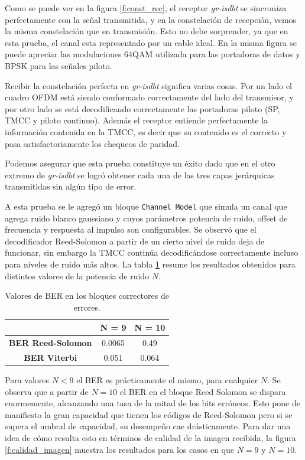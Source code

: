 Como se puede ver en la figura \ref{f:const_rec}, el receptor \textit{gr-isdbt} se sincroniza perfectamente con la señal transmitida, y en la constelación de recepción, vemos la misma constelación que en transmisión. Esto no debe sorprender, ya que en esta prueba, el canal esta representado por un cable ideal. En la misma figura se puede apreciar las modulaciones 64QAM utilizada para las portadoras de datos y BPSK para las señales piloto. 

Recibir la constelación perfecta en \textit{gr-isdbt} significa varias cosas. Por un lado el cuadro OFDM está siendo conformado correctamente del lado del transmisor, y por otro lado se está decodificando correctamente las portadoras piloto (SP, TMCC y piloto continuo). Además el receptor entiende perfectamente la información contenida en la TMCC, es decir que su contenido es el correcto y pasa satisfactoriamente los chequeos de paridad.

Podemos asegurar que esta prueba constituye un éxito dado que en el otro extremo de \textit{gr-isdbt} se logró obtener cada una de las tres capas jerárquicas transmitidas sin algún tipo de error.

A esta prueba se le agregó un bloque \verb|Channel Model| que simula un canal que agrega ruido blanco gaussiano y cuyos parámetros potencia de ruido, offset de frecuencia y respuesta al impulso son configurables. Se observó que el decodificador Reed-Solomon a partir de un cierto nivel de ruido deja de funcionar, sin embargo la TMCC continúa decodificándose correctamente incluso para niveles de ruido más altos. La tabla \ref{t:resultados_errores} resume los resultados obtenidos para distintos valores de la potencia de ruido $N$.

\begin{table}[h!]
	\centering
	\begin{tabular}{|c|c|c|}
		\hline
			& \textbf{N = 9} & \textbf{N = 10}\\
		\hline
		\textbf{BER Reed-Solomon} & 0.0065 & 0.49\\
		\hline
		\textbf{BER Viterbi}		& 0.051 & 0.064\\
		\hline
	\end{tabular}
	\caption{\label{t:resultados_errores} Valores de BER en los bloques correctores de errores.}
\end{table} 

Para valores $N < 9$ el BER es prácticamente el mismo, para cualquier $N$. Se observa que a partir de $N = 10$ el BER en el bloque Reed Solomon se dispara enormemente, alcanzando una tasa de la mitad de los bits erróneos. Esto pone de manifiesto la gran capacidad que tienen los códigos de Reed-Solomon pero si se supera el umbral de capacidad, su desempeño cae drásticamente. Para dar una idea de cómo resulta esto en términos de calidad de la imagen recibida, la figura \ref{f:calidad_imagen} muestra los resultados para los casos en que $N = 9$ y $N = 10$.

